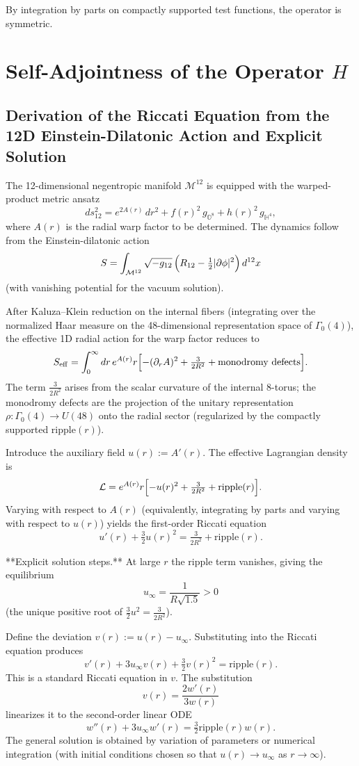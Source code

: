 \documentclass[11pt,a4paper]{article}
\begin{document}
By integration by parts on compactly supported test functions, the operator is symmetric.

\section{Self-Adjointness of the Operator \texorpdfstring{$H$}{H}}

\subsection{Derivation of the Riccati Equation from the 12D Einstein-Dilatonic Action and Explicit Solution}

The 12-dimensional negentropic manifold \(\mathcal{M}^{12}\) is equipped with the warped-product metric ansatz
\[
ds_{12}^2 = e^{2A(r)}\,dr^2 + f(r)^2\,g_{\mathbb{O}^8} + h(r)^2\,g_{\mathbb{H}^4},
\]
where \(A(r)\) is the radial warp factor to be determined. The dynamics follow from the Einstein-dilatonic action
\[
S = \int_{\mathcal{M}^{12}} \sqrt{-g_{12}}\,\Bigl(R_{12} - \tfrac12 |\partial\phi|^2\Bigr)\,d^{12}x
\]
(with vanishing potential for the vacuum solution).

After Kaluza--Klein reduction on the internal fibers (integrating over the normalized Haar measure on the 48-dimensional representation space of \(\Gamma_0(4)\)), the effective 1D radial action for the warp factor reduces to
\[
S_{\rm eff} = \int_0^\infty dr\, e^{A(r)} r \Bigl[ -(\partial_r A)^2 + \tfrac{3}{2R^2} + \text{monodromy defects} \Bigr].
\]
The term \(\tfrac{3}{2R^2}\) arises from the scalar curvature of the internal 8-torus; the monodromy defects are the projection of the unitary representation \(\rho:\Gamma_0(4)\to U(48)\) onto the radial sector (regularized by the compactly supported \(\mathrm{ripple}(r)\)).

Introduce the auxiliary field \(u(r) := A'(r)\). The effective Lagrangian density is
\[
\mathcal{L} = e^{A(r)} r \Bigl[ -u(r)^2 + \tfrac{3}{2R^2} + \mathrm{ripple}(r) \Bigr].
\]
Varying with respect to \(A(r)\) (equivalently, integrating by parts and varying with respect to \(u(r)\)) yields the first-order Riccati equation
\[
u'(r) + \tfrac{3}{2} u(r)^2 = \tfrac{3}{2R^2} + \mathrm{ripple}(r).
\]

**Explicit solution steps.**  
At large \(r\) the ripple term vanishes, giving the equilibrium
\[
u_\infty = \frac{1}{R\sqrt{1.5}} > 0
\]
(the unique positive root of \(\tfrac{3}{2}u^2 = \tfrac{3}{2R^2}\)).

Define the deviation \(v(r) := u(r) - u_\infty\). Substituting into the Riccati equation produces
\[
v'(r) + 3 u_\infty v(r) + \tfrac{3}{2} v(r)^2 = \mathrm{ripple}(r).
\]
This is a standard Riccati equation in \(v\). The substitution
\[
v(r) = \frac{2 w'(r)}{3 w(r)}
\]
linearizes it to the second-order linear ODE
\[
w''(r) + 3 u_\infty w'(r) = \tfrac{3}{2} \mathrm{ripple}(r) w(r).
\]
The general solution is obtained by variation of parameters or numerical integration (with initial conditions chosen so that \(u(r) \to u_\infty\) as \(r\to\infty\)).
\end{document}
